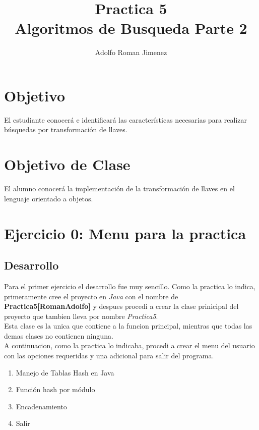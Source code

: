 \documentclass{article}
\title
{
	Practica 5 \\
	Algoritmos de Busqueda Parte 2
}
\author
{
	Adolfo Roman Jimenez
}
\begin{document}
	
	
	
	\maketitle
	
	\section{Objetivo}
		
		El estudiante conocerá e identificará las características necesarias para realizar búsquedas por transformación de llaves.
		
	\section{Objetivo de Clase}
		
		El alumno conocerá la implementación de la transformación de llaves en el
		lenguaje orientado a objetos.
		
	\newpage
		
	\section{Ejercicio 0: Menu para la practica}
	
		\subsection{Desarrollo}
		
			Para el primer ejercicio el desarrollo fue muy sencillo. Como la practica lo indica, primeramente cree el proyecto en \textit{Java} con el nombre de \textbf{Practica5[RomanAdolfo]} y despues procedi a crear la clase prinicipal del proyecto que tambien lleva por nombre \emph{Practica5}.\\
			
			Esta clase es la unica que contiene a la funcion principal, mientras que todas las demas clases no contienen ninguna.\\
			
			A continuacion, como la practica lo indicaba, procedi a crear el menu del usuario con las opciones requeridas y una adicional para salir del programa.
			
			\begin{enumerate}
				\item Manejo de Tablas Hash en Java
				\item Función hash por módulo
				\item Encadenamiento
				\item Salir
			\end{enumerate}
		
\end{document}
